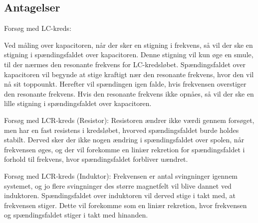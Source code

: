 \subsection{Antagelser}

Forsøg med LC-kreds:

Ved måling over kapacitoren, når der sker en stigning i frekvens, så vil der ske en stigning i spændingsfaldet over kapacitoren. Denne stigning vil kun øge en smule, til der nærmes den resonante frekvens for LC-kredsløbet. Spændingsfaldet over kapacitoren vil begynde at stige kraftigt nær den resonante frekvens, hvor den vil nå sit toppounkt. Herefter vil spændingen igen falde, hvis frekvensen overstiger den resonante frekvens. Hvis den resonante frekvens ikke opnåes, så vil der ske en lille stigning i spændingsfaldet over kapacitoren.

Forsøg med LCR-kreds (Resistor):
Resistoren ændrer ikke værdi gennem forsøget, men har en fast resistens i kredsløbet, hvorved spændingsfaldet burde holdes stabilt. Derved sker der ikke nogen ændring i spændingsfaldet over spolen, når frekvensen øges, og der vil forekomme en liniær rekretion for spændingsfaldet i forhold til frekvens, hvor spændingsfaldet forbliver uændret.

Forsøg med LCR-kreds (Induktor):
Frekvensen er antal svingninger igennem systemet, og jo flere svingninger des større magnetfelt vil blive dannet ved induktoren. Spændingsfaldet over induktoren vil derved stige i takt med, at frekvensen stiger. Dette vil forekomme som en liniær rekretion, hvor frekvensen og spændingsfaldet stiger i takt med hinanden.
